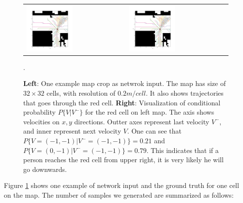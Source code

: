 
\begin{figure}[t]
\begin{tabular}{ll}
\includegraphics[width=0.48\textwidth]{figures/trajs_through_cell.png}
&
\includegraphics[width=0.48\textwidth]{figures/trajs_through_cell.png}
\end{tabular}
\caption{\textbf{Left}: One example map crop as netwrok input. The map has size of \( 32 \times 32 \) cells, with resolution of \( 0.2m/cell\). It also shows trajectories that goes through the red cell. \textbf{Right}: Visualization of conditional probability \( P\{V | V^-\} \) for the red cell on left map. The axis shows velocities on \( x, y\) directions. Outter axes represent last velocity \( V^- \), and inner represent next velocity \( V \). One can see that \( P\{V=(-1, -1) | V^-=(-1, -1)\} = 0.21 \) and \( P\{V=(0, -1) | V^-=(-1, -1)\} = 0.79 \). This indicates that if a person reaches the red cell from upper right, it is very likely he will go downwards. }. 
\label{fig:trajs}
\end{figure}

Figure \ref{fig:trajs} shows one example of network input and the ground truth for one cell on the map. The number of samples we generated are summarized as follows:

